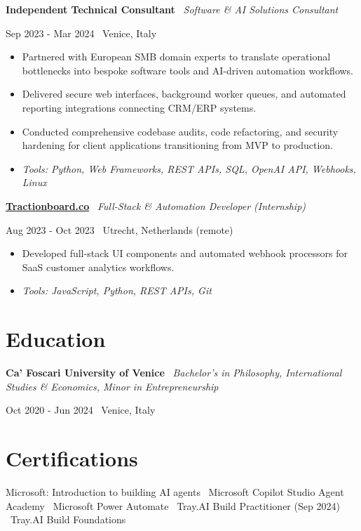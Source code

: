 \documentclass[a4paper,10pt]{article}
\newcommand{\role}[4]{%
  \vspace{2pt}\noindent
  \begin{minipage}[t]{0.70\textwidth}\raggedright\textbf{#1} \textbullet\ \textit{#3}\end{minipage}%
  \hfill
  \begin{minipage}[t]{0.28\textwidth}\raggedleft\footnotesize\color{gray}#2 \textbullet\ #4\end{minipage}%
  \vspace{1pt}%
}
\begin{document}
\role{Independent Technical Consultant}{Sep 2023 - Mar 2024}{Software \& AI Solutions Consultant}{Venice, Italy}
\begin{itemize}
  \item Partnered with European SMB domain experts to translate operational bottlenecks into bespoke software tools and AI-driven automation workflows.
  \item Delivered secure web interfaces, background worker queues, and automated reporting integrations connecting CRM/ERP systems.
  \item Conducted comprehensive codebase audits, code refactoring, and security hardening for client applications transitioning from MVP to production.
  \item \textit{Tools: Python, Web Frameworks, REST APIs, SQL, OpenAI API, Webhooks, Linux}
\end{itemize}

\role{\href{https://tractionboard.co}{Tractionboard.co}}{Aug 2023 - Oct 2023}{Full-Stack \& Automation Developer (Internship)}{Utrecht, Netherlands (remote)}
\begin{itemize}
  \item Developed full-stack UI components and automated webhook processors for SaaS customer analytics workflows.
  \item \textit{Tools: JavaScript, Python, REST APIs, Git}
\end{itemize}

\section{Education}
\role{Ca' Foscari University of Venice}{Oct 2020 - Jun 2024}{Bachelor's in Philosophy, International Studies \& Economics, Minor in Entrepreneurship}{Venice, Italy}

\section{Certifications}
Microsoft: Introduction to building AI agents \textbullet\ Microsoft Copilot Studio Agent Academy \textbullet\ Microsoft Power Automate \textbullet\ Tray.AI Build Practitioner (Sep 2024) \textbullet\ Tray.AI Build Foundations

\end{document}
